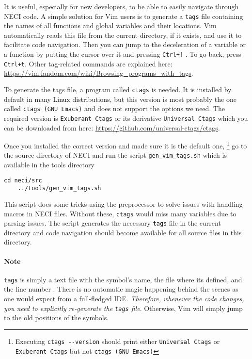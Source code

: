 \documentclass[a4paper,notitlepage]{scrreprt}
\let\code\lstinline
\begin{document}
It is useful, especially for new developers, to be able to easily navigate through NECI code.
A simple solution for Vim users is to generate a \code{tags} file containing the names of all functions and global variables and their locations. 
Vim automatically reads this file from the current directory, if it exists, and use it to facilitate code navigation. Then you can jump to the deceleration of a variable or a function
by putting the cursor over it and pressing \code{Ctrl+]} . To go back, press \code{Ctrl+t}.
Other tag-related commands are explained here: \url{https://vim.fandom.com/wiki/Browsing_programs_with_tags}.

To generate the tags file, a program called \code{ctags} is needed. It is installed  by default in many Linux distributions, but this version is most probably the one called  \code {ctags (GNU Emacs)} and does not support the options we need. The required version is \code{Exuberant Ctags} or its derivative \code{Universal Ctags} which you can be downloaded from here: \url{https://github.com/universal-ctags/ctags}. 

Once you installed the correct version and made sure it is the default one,  \footnote{Executing \code{ctags --version} should print either \code{Universal Ctags} or \code{Exuberant Ctags} but not \code{ctags (GNU Emacs)}} go to the source directory of NECI and run the script \code{gen_vim_tags.sh} which is available in the tools directory
\begin{lstlisting}[gobble=4]
	 cd neci/src
    ../tools/gen_vim_tags.sh
 \end{lstlisting}
 This script does some tricks using the preprocessor to solve issues with handling macros in NECI files.  Without these, \code{ctags} would miss many variables due to parsing issues.
The script generates the necessary \code{tags} file in the current directory and code navigation should become available for all source files in this directory.


\paragraph{Note} \code{tags} is simply a text file with the symbol's name,  the file where its defined, and the line number . There is no automatic magic happening behind the scenes as one would expect from a full-fledged IDE. \emph{Therefore, whenever the code changes, you need to explicitly re-generate the \code{tags} file}. Otherwise, Vim will simply jump to the old positions of the symbols.
\end{document}
